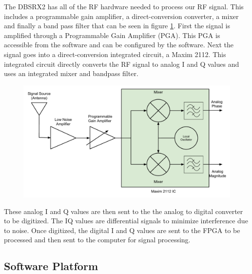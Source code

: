 The DBSRX2 has all of the RF hardware needed to process our RF signal.  This includes a programmable gain amplifier, a direct-conversion converter, a mixer and finally a band pass filter that can be seen in figure \ref{dbsrx2_block}.  First the signal is amplified through a Programmable Gain Amplifier (PGA).  This PGA is accessible from the software and can be configured by the software.  Next the signal goes into a direct-conversion integrated circuit, a Maxim 2112.  This integrated circuit directly converts the RF signal to analog I and Q values and uses an integrated mixer and bandpass filter.

{\begin{figure}[h!tb] 
\centering
\includegraphics[width=\textwidth]{Images/DBSRX2_block.pdf}
\label{dbsrx2_block}
\end{figure}
}


These analog I and Q values are then sent to the the analog to digital converter to be digitized.  The IQ values are differential signals to minimize interference due to noise.  Once digitized, the digital I and Q values are sent to the FPGA to be processed and then sent to the computer for signal processing.


\subsection{Software Platform} \label{software_platform}

